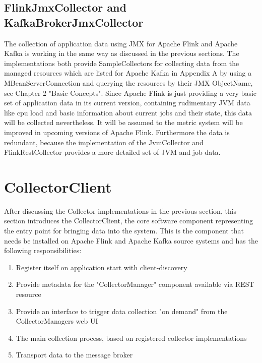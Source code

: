 \subsection{FlinkJmxCollector and KafkaBrokerJmxCollector}

The collection of application data using JMX for Apache Flink and Apache Kafka is working in the
same way as discussed in the previous sections. The implementations both provide SampleCollectors for collecting data
from the managed resources which are listed for Apache Kafka in Appendix A by using a MBeanServerConnection and querying the resources by their JMX ObjectName,
see Chapter 2 "Basic Concepts". Since Apache Flink is just providing a very basic set
of application data in its current version, containing rudimentary JVM data like cpu load and basic information about current
jobs and their state, this data will be collected nevertheless. It will be assumed to the metric system will be improved in upcoming versions
of Apache Flink. Furthermore the data is redundant, because the implementation of the JvmCollector and FlinkRestCollector provides a
more detailed set of JVM and job data.

\section{CollectorClient}
\label{sec:impl-collector-client}

After discussing the Collector implementations in the previous section, this section introduces the CollectorClient,
the core software component representing the entry point for bringing data into the system. This is the component that needs be
installed on Apache Flink and Apache Kafka source systems and has the following responsibilities:

\begin{enumerate}
    \item Register itself on application start with client-discovery
    \item Provide metadata for the "CollectorManager" component available via REST resource
    \item Provide an interface to trigger data collection "on demand" from the CollectorManagers web UI
    \item The main collection process, based on registered collector implementations
    \item Transport data to the message broker
\end{enumerate}

